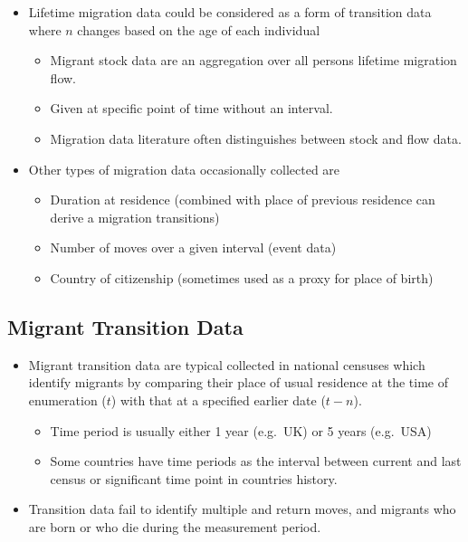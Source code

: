 \documentclass[
]{book}
\providecommand{\tightlist}{%
  \setlength{\itemsep}{0pt}\setlength{\parskip}{0pt}}
\begin{document}
\begin{itemize}
\tightlist
\item
  Lifetime migration data could be considered as a form of transition data where \(n\) changes based on the age of each individual

  \begin{itemize}
  \tightlist
  \item
    Migrant stock data are an aggregation over all persons lifetime migration flow.
  \item
    Given at specific point of time without an interval.
  \item
    Migration data literature often distinguishes between stock and flow data.
  \end{itemize}
\item
  Other types of migration data occasionally collected are

  \begin{itemize}
  \tightlist
  \item
    Duration at residence (combined with place of previous residence can derive a migration transitions)
  \item
    Number of moves over a given interval (event data)
  \item
    Country of citizenship (sometimes used as a proxy for place of birth)
  \end{itemize}
\end{itemize}

\hypertarget{migrant-transition-data}{%
\subsection{Migrant Transition Data}\label{migrant-transition-data}}

\begin{itemize}
\tightlist
\item
  Migrant transition data are typical collected in national censuses which identify migrants by comparing their place of usual residence at the time of enumeration (\(t\)) with that at a specified earlier date (\(t-n\)).

  \begin{itemize}
  \tightlist
  \item
    Time period is usually either 1 year (e.g.~UK) or 5 years (e.g.~USA)
  \item
    Some countries have time periods as the interval between current and last census or significant time point in countries history.
  \end{itemize}
\item
  Transition data fail to identify multiple and return moves, and migrants who are born or who die during the measurement period.
\end{itemize}
\end{document}
